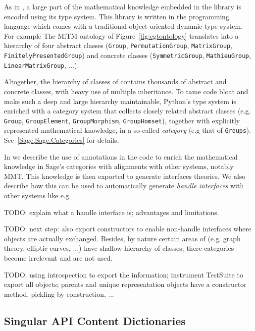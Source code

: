 As in \GAP, a large part of the mathematical knowledge embedded in the
\Sage library is encoded using its type system. This library is
written in the \Python programming language which comes with a
traditional object oriented dynamic type system.
For example The MiTM ontology of Figure~\ref{fig:cgtontology}
translates into a hierarchy of four abstract classes (\texttt{Group},
\texttt{PermutationGroup}, \texttt{MatrixGroup},
\texttt{FinitelyPresentedGroup}) and concrete classes
(\texttt{SymmetricGroup}, \texttt{MathieuGroup},
\texttt{LinearMatrixGroup}, ...).

Altogether, the hierarchy of classes of \Sage contains thousands of
abstract and concrete classes, with heavy use of multiple inheritance.
To tame code bloat and make such a deep and large hierarchy
maintainable, Python's type system is enriched with a category system
that collects closely related abstract classes (e.g. \texttt{Group},
\texttt{GroupElement}, \texttt{GroupMorphism}, \texttt{GroupHomset}),
together with explicitly represented mathematical knowledge, in a
so-called \emph{category} (e.g that of \texttt{Groups}).
See~\ref{Sage,Sage.Categories} for details.

In \cite{DehKohKon:iop16} we describe the use of annotations in the
code to enrich the mathematical knowledge in Sage's categories with
alignments with other systems, notably MMT. This knowledge is then
exported to generate interfaces theories. We also describe how this
can be used to automatically generate \emph{handle interfaces} with
other systems like e.g. \GAP.

TODO: explain what a handle interface is; advantages and limitations.

TODO: next step: also export constructors to enable non-handle
interfaces where objects are actually exchanged. Besides, by nature
certain areas of \Sage (e.g. graph theory, elliptic curves, ...) have
shallow hierarchy of classes; there categories become irrelevant and
are not used. 

TODO: using introspection to export the information; instrument
TestSuite to export all objects; parents and unique representation
objects have a constructor method. pickling by construction, ...

\subsection{Singular API Content Dictionaries}


